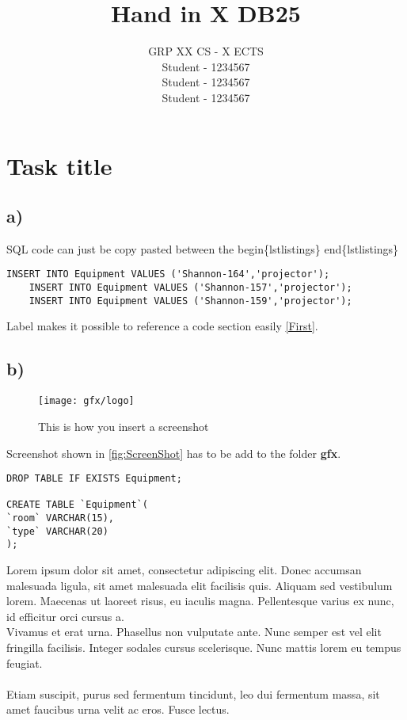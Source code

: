 \documentclass[twoside, a4paper, 11pt]{article}
\newcommand{\StudA}{\small Student - 1234567}
\newcommand{\StudB}{\small Student - 1234567}
\newcommand{\StudC}{\small Student - 1234567}
\newcommand{\GRP}{ GRP XX}
\newcommand{\study}{ CS - X ECTS}
\newcommand{\groupinfo}{\GRP \study \\ \StudA\\ \StudB\\ \StudC\\}
\begin{document}
	
	\title{Hand in X DB25} %
	\author{ \groupinfo}
	\date{}
	\maketitle
	\thispagestyle{empty}

\section{Task title}
\subsection*{a)}
SQL code can just be copy pasted between the begin\{lstlistings\} end\{lstlistings\}
\begin{lstlisting}[label=First, caption={SQL code}]
	INSERT INTO Equipment VALUES ('Shannon-164','projector');
	INSERT INTO Equipment VALUES ('Shannon-157','projector');
	INSERT INTO Equipment VALUES ('Shannon-159','projector');
\end{lstlisting}

\noindent
Label makes it possible to reference a code section easily \autoref{First}. 

\subsection*{b)}

\begin{figure}[h]
	\centering
	\texttt{[image: gfx/logo]}
	\caption{This is how you insert a screenshot} %
	\label{fig:ScreenShot}
\end{figure}

\noindent
Screenshot shown in \autoref{fig:ScreenShot} has to be add to the folder \textbf{gfx}.


\begin{lstlisting}[label=Second]
DROP TABLE IF EXISTS Equipment;

CREATE TABLE `Equipment`(
`room` VARCHAR(15),
`type` VARCHAR(20)
);
\end{lstlisting}
\noindent
Lorem ipsum dolor sit amet, consectetur adipiscing elit. Donec accumsan malesuada ligula, sit amet malesuada elit facilisis quis. Aliquam sed vestibulum lorem. Maecenas ut laoreet risus, eu iaculis magna. Pellentesque varius ex nunc, id efficitur orci cursus a.\\ %
Vivamus et erat urna. Phasellus non vulputate ante. Nunc semper est vel elit fringilla facilisis. Integer sodales cursus scelerisque. Nunc mattis lorem eu tempus feugiat.\\\\ %
Etiam suscipit, purus sed fermentum tincidunt, leo dui fermentum massa, sit amet faucibus urna velit ac eros. Fusce lectus.
\end{document}
